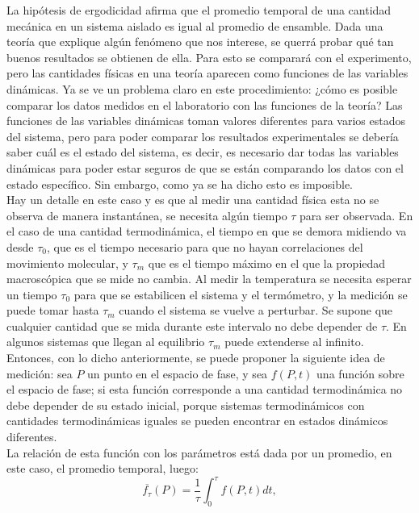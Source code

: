 La hipótesis de ergodicidad afirma que el promedio temporal de una cantidad mecánica en un sistema aislado es igual al promedio de ensamble. Dada una teoría que explique algún fenómeno que nos interese, se querrá probar qué tan buenos resultados se obtienen de ella. Para esto se comparará con el experimento, pero las cantidades físicas en una teoría aparecen como funciones de las variables dinámicas. Ya se ve un problema claro en este procedimiento: ¿cómo es posible comparar los datos medidos en el laboratorio con las funciones de la teoría? Las funciones de las variables dinámicas toman valores diferentes para varios estados del sistema, pero para poder comparar los resultados experimentales se debería saber cuál es el estado del sistema, es decir, es necesario dar todas las variables dinámicas para poder estar seguros de que se están comparando los datos con el estado específico. Sin embargo, como ya se ha dicho esto es imposible.
\\
Hay un detalle en este caso y es que al medir una cantidad física esta no se observa de manera instantánea, se necesita algún tiempo $\tau$ para ser observada. En el caso de una cantidad termodinámica, el tiempo en que se demora midiendo va desde $\tau_{0}$, que es el tiempo necesario para que no hayan correlaciones del movimiento molecular, y  $\tau_{m}$ que es el tiempo máximo en el que la propiedad macroscópica que se mide no cambia. Al medir la temperatura se necesita esperar un tiempo $\tau_{0}$ para que se estabilicen el sistema y el termómetro, y la medición se puede tomar hasta $\tau_{m}$ cuando el sistema se vuelve a perturbar. Se supone que cualquier cantidad que se mida durante este intervalo no debe depender de $\tau$. En algunos sistemas que llegan al equilibrio $\tau_{m}$ puede extenderse al infinito.
\\
Entonces, con lo dicho anteriormente, se puede proponer la siguiente idea de medición: sea $P$ un punto en el espacio de fase, y sea $f(P,t)$ una función sobre el espacio de fase; si esta función corresponde a una cantidad termodinámica no debe depender de su estado inicial, porque sistemas termodinámicos con cantidades termodinámicas iguales se pueden encontrar en estados dinámicos diferentes. \\
La relación de esta función con los parámetros está dada por un promedio, en este caso, el promedio temporal, luego:
\begin{equation}
\overline{f_{\tau}}(P)= \frac{1}{\tau} \int_{0}^{\tau} f(P,t) dt,
\end{equation}
 
